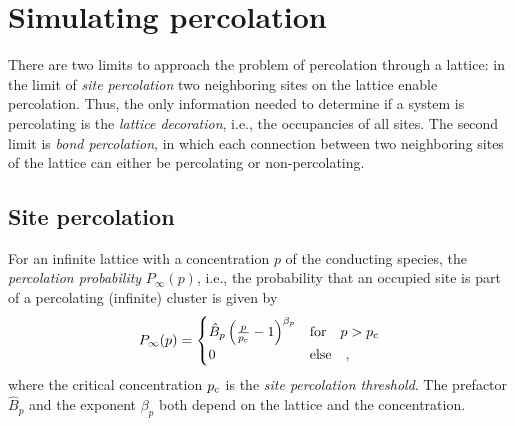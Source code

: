 \documentclass{scrartcl}
\begin{document}
\section{Simulating percolation}

There are two limits to approach the problem of percolation through a
lattice: in the limit of \emph{site percolation} two neighboring sites
on the lattice enable percolation.  Thus, the only information needed to
determine if a system is percolating is the \emph{lattice decoration},
i.e., the occupancies of all sites.  The second limit is \emph{bond
  percolation}, in which each connection between two neighboring sites
of the lattice can either be percolating or non-percolating.  

\subsection{Site percolation}

For an infinite lattice with a concentration $p$ of the conducting
species, the \emph{percolation probability} $P_{\infty}(p)$, i.e., the
probability that an occupied site is part of a percolating (infinite)
cluster is given by
%
\begin{align}
  P_{\infty}(p) 
  = \begin{cases}
    \hat{B}_{p}\,
    \Bigl( 
      \frac{p}{p_{\textup{c}}} - 1
    \Bigr)^{\beta_{p}}
    & \text{for}\quad p>p_{\textup{c}}
    \\
    0 & \text{else}
    \quad ,
  \end{cases}
  \label{eq:P_infty}
\end{align}
%
where the critical concentration $p_{\textup{c}}$ is the \emph{site
  percolation threshold}.  The prefactor $\hat{B}_{p}$ and the exponent
$\beta_{p}$ both depend on the lattice and the concentration.
\end{document}

